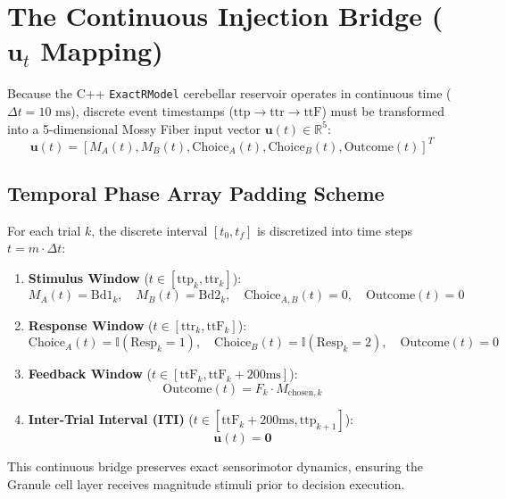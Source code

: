 \documentclass[11pt,a4paper]{article}
\begin{document}
\section{The Continuous Injection Bridge ($\mathbf{u}_t$ Mapping)}

Because the C++ \texttt{ExactRModel} cerebellar reservoir operates in continuous time ($\Delta t = 10\text{ ms}$), discrete event timestamps ($\text{ttp} \to \text{ttr} \to \text{ttF}$) must be transformed into a 5-dimensional Mossy Fiber input vector $\mathbf{u}(t) \in \mathbb{R}^5$:
\begin{equation}
\mathbf{u}(t) = \left[ M_A(t), M_B(t), \text{Choice}_A(t), \text{Choice}_B(t), \text{Outcome}(t) \right]^T
\end{equation}

\subsection{Temporal Phase Array Padding Scheme}
For each trial $k$, the discrete interval $[t_0, t_f]$ is discretized into time steps $t = m \cdot \Delta t$:

\begin{enumerate}
    \item \textbf{Stimulus Window} ($t \in [\text{ttp}_k, \text{ttr}_k]$):
    $$M_A(t) = \text{Bd1}_k, \quad M_B(t) = \text{Bd2}_k, \quad \text{Choice}_{A,B}(t) = 0, \quad \text{Outcome}(t) = 0$$
    \item \textbf{Response Window} ($t \in [\text{ttr}_k, \text{ttF}_k]$):
    $$\text{Choice}_A(t) = \mathbb{I}(\text{Resp}_k = 1), \quad \text{Choice}_B(t) = \mathbb{I}(\text{Resp}_k = 2), \quad \text{Outcome}(t) = 0$$
    \item \textbf{Feedback Window} ($t \in [\text{ttF}_k, \text{ttF}_k + 200\text{ms}]$):
    $$\text{Outcome}(t) = F_k \cdot M_{\text{chosen}, k}$$
    \item \textbf{Inter-Trial Interval (ITI)} ($t \in [\text{ttF}_k + 200\text{ms}, \text{ttp}_{k+1}]$):
    $$\mathbf{u}(t) = \mathbf{0}$$
\end{enumerate}

This continuous bridge preserves exact sensorimotor dynamics, ensuring the Granule cell layer receives magnitude stimuli prior to decision execution.
\end{document}
